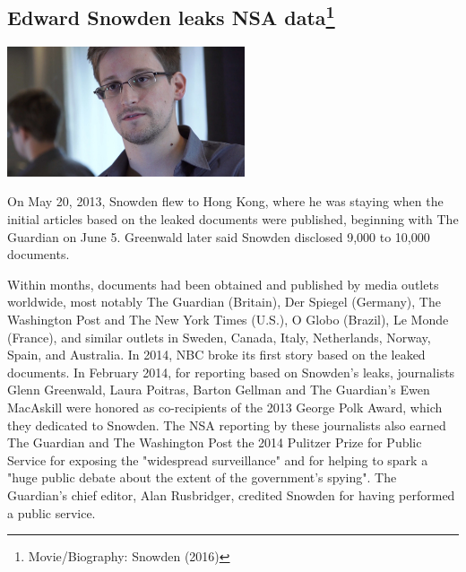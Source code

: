 \documentclass[11pt]{report}
\begin{document}
\subsection{Edward Snowden leaks NSA data\protect\footnote{Movie/Biography: Snowden (2016)}}
\vspace{2mm}\begin{center}\includegraphics[width=7cm]{./img/edwardSnowden.jpg}\end{center}
On May 20, 2013, Snowden flew to Hong Kong, where he was staying when the initial articles based on the leaked documents were published, beginning with The Guardian on June 5. Greenwald later said Snowden disclosed 9,000 to 10,000 documents.

Within months, documents had been obtained and published by media outlets worldwide, most notably The Guardian (Britain), Der Spiegel (Germany), The Washington Post and The New York Times (U.S.), O Globo (Brazil), Le Monde (France), and similar outlets in Sweden, Canada, Italy, Netherlands, Norway, Spain, and Australia. In 2014, NBC broke its first story based on the leaked documents. In February 2014, for reporting based on Snowden's leaks, journalists Glenn Greenwald, Laura Poitras, Barton Gellman and The Guardian's Ewen MacAskill were honored as co-recipients of the 2013 George Polk Award, which they dedicated to Snowden. The NSA reporting by these journalists also earned The Guardian and The Washington Post the 2014 Pulitzer Prize for Public Service for exposing the "widespread surveillance" and for helping to spark a "huge public debate about the extent of the government's spying". The Guardian's chief editor, Alan Rusbridger, credited Snowden for having performed a public service.
\end{document}
